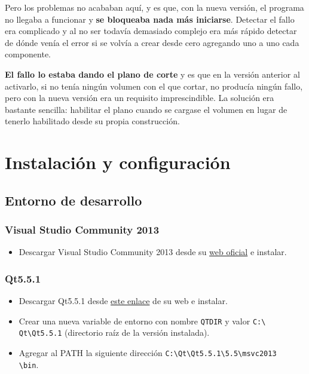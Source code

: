 Pero los problemas no acababan aquí, y es que, con la nueva versión, el programa no llegaba a funcionar y \textbf{se bloqueaba nada más iniciarse}. Detectar el fallo era complicado y al no ser todavía demasiado complejo era más rápido detectar de dónde venía el error si se volvía a crear desde cero agregando uno a uno cada componente.

\textbf{El fallo lo estaba dando el plano de corte} y es que en la versión anterior al activarlo, si no tenía ningún volumen con el que cortar, no producía ningún fallo, pero con la nueva versión era un requisito imprescindible. La solución era bastante sencilla: habilitar el plano cuando se cargase el volumen en lugar de tenerlo habilitado desde su propia construcción.

\section{Instalación y configuración}

\subsection{Entorno de desarrollo}

\subsubsection{Visual Studio Community 2013}

\begin{itemize}
	\item Descargar Visual Studio Community 2013 desde su \href{https://www.visualstudio.com/es-es/downloads/download-visual-studio-vs.aspx}{web oficial} e instalar.
\end{itemize}

\subsubsection{Qt5.5.1}

\begin{itemize}
	\item Descargar Qt5.5.1 desde \href{http://download.qt.io/official_releases/qt/5.5/5.5.1/qt-opensource-windows-x86-msvc2013-5.5.1.exe}{este enlace} de su web e instalar.
	\item Crear una nueva variable de entorno con nombre \texttt{QTDIR} y valor \texttt{C:\textbackslash\\ Qt\textbackslash Qt5.5.1} (directorio raíz de la versión instalada).
	\item Agregar al PATH la siguiente dirección \texttt{C:\textbackslash Qt\textbackslash Qt5.5.1\textbackslash 5.5\textbackslash msvc2013\\ \textbackslash bin}.
\end{itemize}

